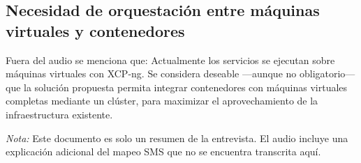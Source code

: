 \subsection{Necesidad de orquestación entre máquinas virtuales y contenedores}
Fuera del audio se menciona que: Actualmente los servicios se ejecutan sobre máquinas virtuales con XCP-ng. Se considera deseable —aunque no obligatorio— que la solución propuesta permita integrar contenedores con máquinas virtuales completas mediante un clúster, para maximizar el aprovechamiento de la infraestructura existente.

\bigskip\noindent \textit{Nota:} Este documento es solo un resumen de la entrevista. El audio incluye una explicación adicional del mapeo SMS que no se encuentra transcrita aquí.